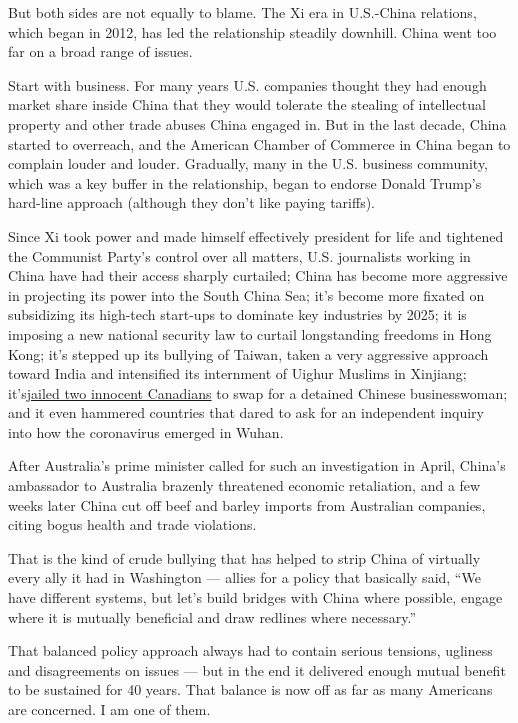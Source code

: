 But both sides are not equally to blame. The Xi era in U.S.-China
relations, which began in 2012, has led the relationship steadily
downhill. China went too far on a broad range of issues.

Start with business. For many years U.S. companies thought they had
enough market share inside China that they would tolerate the stealing
of intellectual property and other trade abuses China engaged in. But in
the last decade, China started to overreach, and the American Chamber of
Commerce in China began to complain louder and louder. Gradually, many
in the U.S. business community, which was a key buffer in the
relationship, began to endorse Donald Trump's hard-line approach
(although they don't like paying tariffs).

Since Xi took power and made himself effectively president for life and
tightened the Communist Party's control over all matters, U.S.
journalists working in China have had their access sharply curtailed;
China has become more aggressive in projecting its power into the South
China Sea; it's become more fixated on subsidizing its high-tech
start-ups to dominate key industries by 2025; it is imposing a new
national security law to curtail longstanding freedoms in Hong Kong;
it's stepped up its bullying of Taiwan, taken a very aggressive approach
toward India and intensified its internment of Uighur Muslims in
Xinjiang;
it's\href{https://www.theglobeandmail.com/canada/article-something-has-to-change-michael-kovrigs-letters-detail-life-in-a/}{jailed
two innocent Canadians} to swap for a detained Chinese businesswoman;
and it even hammered countries that dared to ask for an independent
inquiry into how the coronavirus emerged in Wuhan.

After Australia's prime minister called for such an investigation in
April, China's ambassador to Australia brazenly threatened economic
retaliation, and a few weeks later China cut off beef and barley imports
from Australian companies, citing bogus health and trade violations.

That is the kind of crude bullying that has helped to strip China of
virtually every ally it had in Washington --- allies for a policy that
basically said, ``We have different systems, but let's build bridges
with China where possible, engage where it is mutually beneficial and
draw redlines where necessary.''

That balanced policy approach always had to contain serious tensions,
ugliness and disagreements on issues --- but in the end it delivered
enough mutual benefit to be sustained for 40 years. That balance is now
off as far as many Americans are concerned. I am one of them.

